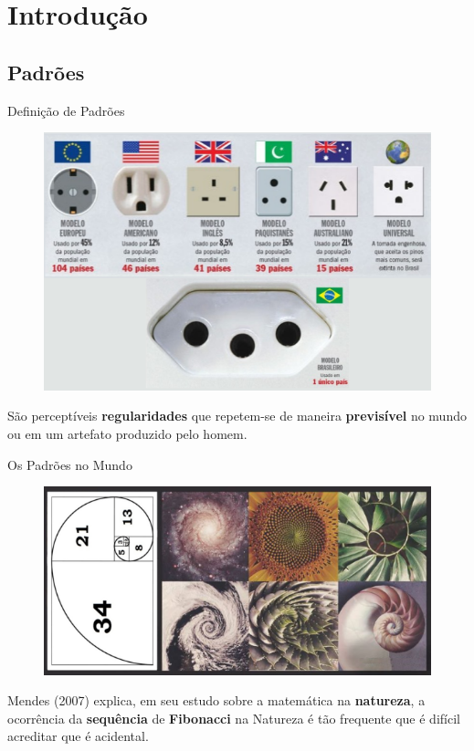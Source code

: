 \section{Introdução}

\subsection{Padrões}
    \begin{frame}[fragile]{Definição de Padrões}
        \begin{figure}[H]
        \begin{center}
            \includegraphics[scale=0.50]{images/padroes.png}
        \end{center}
        \end{figure}

        São perceptíveis \textbf{regularidades} que repetem-se de maneira 
        \textbf{previsível} no  mundo ou em um artefato produzido pelo homem.
    \end{frame}

    \begin{frame}[fragile]{Os Padrões no Mundo}
        \begin{figure}[H]
        \begin{center}
            \includegraphics[scale=0.60]{images/padroes_mundo.png}
        \end{center}
        \end{figure}

        Mendes (2007) explica, em seu estudo sobre a matemática na 
        \textbf{natureza}, a ocorrência da \textbf{sequência} de 
        \textbf{Fibonacci} na Natureza é tão frequente que é difícil acreditar 
        que é acidental.
    \end{frame}

